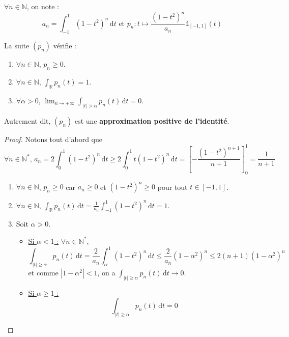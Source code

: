 






	\begin{notation}
		$\forall n \in \mathbb{N}$, on note :
		\[ a_n = \int_{-1}^1 (1-t^2)^n \, \mathrm{d}t \text{ et } p_n : t \mapsto \frac{(1-t^2)^n}{a_n} \mathbb{1}_{[-1, 1]}(t) \]
	\end{notation}

	\begin{lemma}
		\label{theoreme-de-weierstrass-par-la-convolution-1}
		La suite $(p_n)$ vérifie :
		\begin{enumerate}[label=(\roman*)]
			\item $\forall n \in \mathbb{N}$, $p_n \geq 0$.
			\item $\forall n \in \mathbb{N}$, $\int_{\mathbb{R}} p_n(t) = 1$.
			\item $\forall \alpha > 0$, $\lim_{n \rightarrow +\infty} \int_{|t| > \alpha} p_n(t) \, \mathrm{d}t = 0$.
		\end{enumerate}
		Autrement dit, $(p_n)$ est une \textbf{approximation positive de l'identité}.
	\end{lemma}

	\begin{proof}
		Notons tout d'abord que
		\[ \forall n \in \mathbb{N}^*, \, a_n = 2 \int_0^1 (1-t^2)^n \, \mathrm{d}t \geq 2 \int_0^1 t (1-t^2)^n \, \mathrm{d}t = \left[ - \frac{(1-t^2)^{n+1}}{n+1} \right]_0^1 = \frac{1}{n+1}  \]
		\begin{enumerate}[label=(\roman*)]
			\item $\forall n \in \mathbb{N}$, $p_n \geq 0$ car $a_n \geq 0$ et $(1-t^2)^n \geq 0$ pour tout $t \in [-1, 1]$.
			\item $\forall n \in \mathbb{N}$, $\int_{\mathbb{R}} p_n(t) \, \mathrm{d}t = \frac{1}{a_n} \int_{-1}^1 (1-t^2)^n \, \mathrm{d}t = 1$.
			\item Soit $\alpha > 0$.
			\begin{itemize}
				\item \uline{Si $\alpha < 1$ :} $\forall n \in \mathbb{N}^*$,
				\[ \int_{|t| \geq \alpha} p_n(t) \, \mathrm{d}t = \frac{2}{a_n} \int_\alpha^1 (1-t^2)^n \, \mathrm{d}t \leq \frac{2}{a_n} (1-\alpha^2)^n \leq 2(n+1)(1-\alpha^2)^n \]
				et comme $|1-\alpha^2| < 1$, on a $\int_{|t| \geq \alpha} p_n(t) \, \mathrm{d}t \longrightarrow 0$.
				\item \uline{Si $\alpha \geq 1$ :}
				\[ \int_{|t| \geq \alpha} p_n(t) \, \mathrm{d}t = 0 \]
			\end{itemize}
		\end{enumerate}
	\end{proof}

